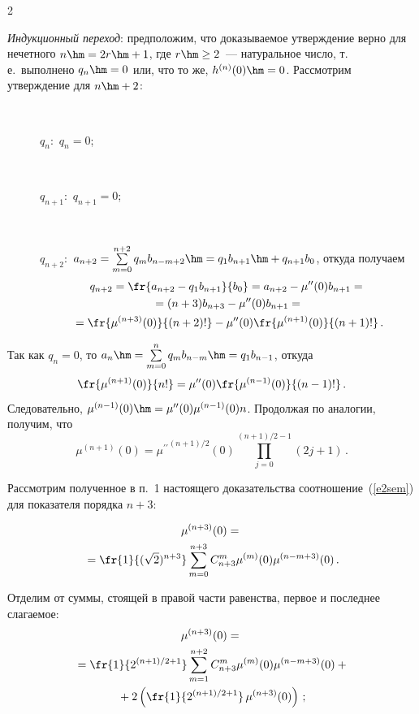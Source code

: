 \begin{multicols}{2}
{\begin{enumerate}[1.]
  \textit{Индукционный переход}: предположим, что доказываемое утверждение 
верно для нечетного $n\hm=2r\hm+1$, где $r\hm\geq 2$~--- натуральное чис\-ло, 
т.\,е.\ выполнено $q_n\hm=0$ или, что то же, $h^{(n)}(0)\hm=0$. Рассмотрим 
утверждение для $n\hm+2$:
\begin{description}
    \item[\,]
  $q_n$:\ $q_n=0$;
    \item[\,]
  $q_{n+1}$:\ $q_{n+1}=0$;
    \item[\,]
  $q_{n+2}$:\ $a_{n+2}=\sum\limits_{m=0}^{n+2} q_m b_{n-
m+2}\hm=q_1b_{n+1}\hm+q_{n+1}b_0$, откуда получаем 
\begin{multline*}
  q_{n+2} = \fr{a_{n+2}-q_1 b_{n+1}}{b_0}= a_{n+2} - 
\mu^{\prime\prime}(0)b_{n+1}={}\\
{}=
(n+3)b_{n+3}-\mu^{\prime\prime}(0)b_{n+1}={}\\
{}=
  \fr{\mu^{(n+3)}(0)}{(n+2)!}-
\mu^{\prime\prime}(0)\fr{\mu^{(n+1)}(0)}{(n+1)!}\,.
  \end{multline*}
  \end{description}
    Так как $q_n=0$, то $a_n\hm= \sum\limits_{m=0}^n q_m b_{n-m}\hm= 
q_1b_{n-1}$, откуда 
  $$
  \fr{\mu^{(n+1)}(0)}{n!}=\mu^{\prime\prime}(0)\fr{\mu^{(n-1)}(0)}{(n-1)!}\,.
  $$ 
  Следовательно, $\mu^{(n-1)}(0)\hm=\mu^{\prime\prime}(0)\mu^{(n-1)}(0)n$. 
Продолжая по аналогии, получим, что 
  \begin{equation}
  \mu^{(n+1)}(0) ={\mu^{\prime\prime}}^{(n+1)/2}(0) 
\prod\limits_{j=0}^{(n+1)/2-1} (2j+1)\,.
  \label{e3sem}
  \end{equation}
  
  Рассмотрим полученное в п.~1 настоящего доказательства 
соотношение~(\ref{e2sem}) для показателя порядка $n+3$:

\noindent
 \begin{multline*}
  \mu^{(n+3)}(0)={}\\
  {}=\fr{1}{(\sqrt{2})^{n+3}}\sum\limits_{m=0}^{n+3} C^m_{n+3} 
\mu^{(m)}(0) \mu^{(n-m+3)}(0)\,.
  \end{multline*}
  
  Отделим от суммы, стоящей в правой части равенства, первое и последнее 
слагаемое:
  \begin{multline*}
  \mu^{(n+3)}(0) ={}\\
  {}=
  \fr{1}{2^{(n+1)/2+1}} \sum\limits_{m=1}^{n+2} 
C^m_{n+3}\mu^{(m)}(0) \mu^{(n-m+3)}(0)+{}\\
{}+ 2\left( \fr{1}{2^{(n+1)/2+1}}\,\mu^{(n+3)}(0)\right)\,;
  \end{multline*}
  

\end{enumerate}}
\end{multicols}

